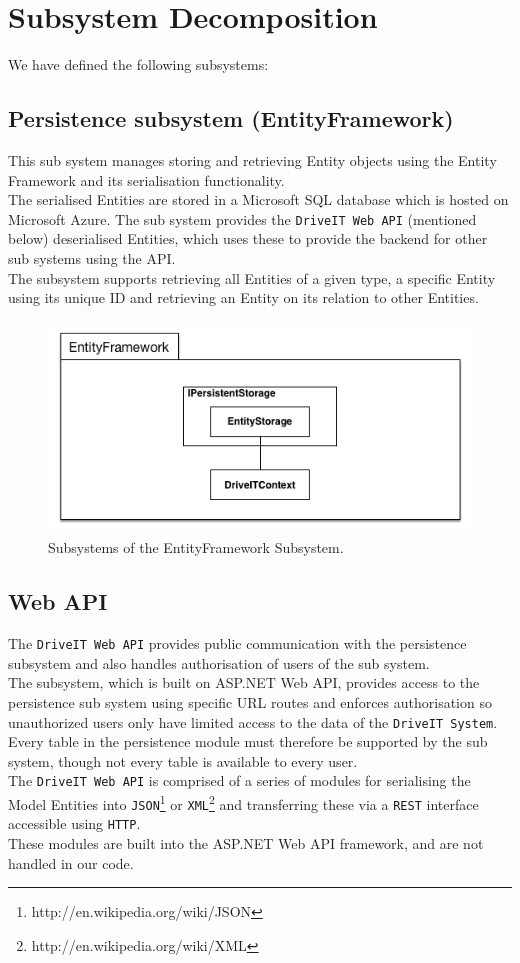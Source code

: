 \section{Subsystem Decomposition}
We have defined the following subsystems:
\subsection{Persistence subsystem (EntityFramework)} 
This sub system manages storing and retrieving Entity objects using the Entity Framework and its serialisation functionality.\\
The serialised Entities are stored in a Microsoft SQL database which is hosted on Microsoft Azure. The sub system provides the \texttt{DriveIT Web API} (mentioned below) deserialised Entities, which uses these to provide the backend for other sub systems using the API.\\
The subsystem supports retrieving all Entities of a given type, a specific Entity using its unique ID and retrieving an Entity on its relation to other Entities. 
\begin{figure}[H]
	\centering
	\includegraphics[scale=0.70]{Figures/EntityFrameworkSubsystemDecomposition}
	\caption{Subsystems of the EntityFramework Subsystem.}
\end{figure}

\subsection{Web API} 
The \texttt{DriveIT Web API} provides public communication with the persistence subsystem and also handles authorisation of users of the sub system.\\
The subsystem, which is built on ASP.NET Web API, provides access to the persistence sub system using specific URL routes and enforces authorisation so unauthorized users only have limited access to the data of the \texttt{DriveIT System}.\\ 
Every table in the persistence module must therefore be supported by the sub system, though not every table is available to every user.\\
The \texttt{DriveIT Web API} is comprised of a series of modules for serialising the Model Entities into \texttt{JSON}\footnote{http://en.wikipedia.org/wiki/JSON} or \texttt{XML}\footnote{http://en.wikipedia.org/wiki/XML} and transferring these via a \texttt{REST} interface accessible using \texttt{HTTP}. \\
These modules are built into the ASP.NET Web API framework, and are not handled in our code.

